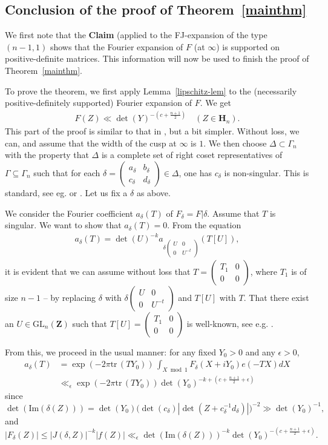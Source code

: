 \documentclass[12pt]{amsart}
\numberwithin{equation}{section}
\theoremstyle{plain}
\newcommand{\thmref}[1]{Theorem~\ref{#1}}
\theoremstyle{definition}
\newcommand{\h}{\mf H}
\newcommand{\im}{\mrm{Im}}
\newcommand{\mf}{\mathbf}
\newcommand{\q}{\quad}
\newcommand{\mrm}{\mathrm}
\newcommand{\glnz}{\mrm{GL}_n( \mf Z)}
\newcommand{\tr}{\mathrm{tr}\,}
\newcommand{\psmb}{\left( \begin{smallmatrix}}
\newcommand{\psme}{ \end{smallmatrix} \right) }
\begin{document}
\subsection{Conclusion of the proof of \thmref{mainthm}}
 We first note  that the {\bf Claim} (applied to  the FJ-expansion of the type $(n-1,1)$ shows that the Fourier expansion of $F$ (at $\infty$) is supported on positive-definite matrices. This information will now be used to finish the proof of \thmref{mainthm}.

To prove the theorem, we first apply Lemma~\ref{lipschitz-lem} to the (necessarily positive-definitely supported) Fourier expansion of $F$. We get
\begin{align}
    F(Z) \ll \det(Y)^{-( c+\frac{n+1}{2} )} \q (Z \in \h_n).
\end{align}
This part of the proof is similar to that in \cite{bo-ko}, but a bit simpler.
Without loss, we can, and assume that the width of the cusp at $\infty$ is $1$.
We then choose $\Delta \subset \Gamma_n$ with the property that $\Delta$ is a complete set of right coset representatives of $\Gamma \subseteq \Gamma_n$ such that for each $\delta = \psmb a_\delta & b_\delta \\ c_\delta & d_\delta\psme\in \Delta$, one has $c_\delta $ is non-singular. This is standard, see eg. \cite[Lemma~1]{bo-ko} or \cite[Proof of Cor.~5.2]{das-supnorm}. Let us fix a $\delta$ as above.

We consider the Fourier coefficient $a_\delta(T)$ of $F_\delta=F | \delta$. Assume that $T$ is singular. We want to show that $a_\delta(T)=0$. From the equation
\begin{align}
a_{\delta}(T) = \det(U)^{-k} a_{\delta \psmb U & 0 \\ 0 & U^{-t} \psme }({T[U]}),
\end{align}
it is evident that we can assume without loss that $T= \psmb T_1 & 0 \\ 0 & 0 \psme$, where $T_1$ is of size $n-1$ -- by replacing $\delta$ with $\delta \psmb U & 0 \\ 0 & U^{-t} \psme$ and $T[U]$ with $T$. That there exist an $U \in \glnz$ such that $T[U]=\psmb T_1 & 0 \\ 0 & 0 \psme$ is well-known, see e.g. \cite[Lemma~3.14]{andrianov2}.

From this, we proceed in the usual manner: for any fixed $Y_0>0$ and any $\epsilon>0$, 
\begin{align}
    a_{\delta}(T) &= \exp(- 2 \pi \tr (T Y_0)) \, \int_{X \bmod 1} F_\delta(X+iY_0) e(-TX)dX \\
    & \ll_\epsilon \exp(- 2 \pi \tr (T Y_0)) \det(Y_0)^{-k+( c+\frac{n+1}{2} +\epsilon)} 
\end{align}
since 
\[ \det( \im(\delta(Z))) = \det(Y_0) \big( \det(c_\delta) |\det(Z+c_\delta^{-1}d_\delta)|\big)^{-2} \gg \det(Y_0)^{-1},\]
and 
\[ |F_\delta(Z)|\le |J(\delta,Z)|^{-k} |f(Z)| \ll_\epsilon \det( \im(\delta(Z)))^{-k}  \det(Y_0)^{-( c+\frac{n+1}{2} +\epsilon)}.\] 
\end{document}

